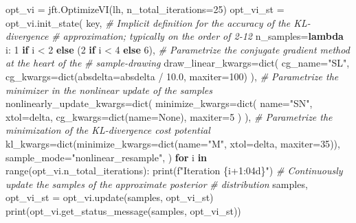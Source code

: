 \documentclass[10pt,a4paper,onecolumn]{article}
\newenvironment{Shaded}{}{}
\newcommand{\BuiltInTok}[1]{#1}
\newcommand{\CommentTok}[1]{\textcolor[rgb]{0.38,0.63,0.69}{\textit{#1}}}
\newcommand{\ControlFlowTok}[1]{\textcolor[rgb]{0.00,0.44,0.13}{\textbf{#1}}}
\newcommand{\DecValTok}[1]{\textcolor[rgb]{0.25,0.63,0.44}{#1}}
\newcommand{\FloatTok}[1]{\textcolor[rgb]{0.25,0.63,0.44}{#1}}
\newcommand{\KeywordTok}[1]{\textcolor[rgb]{0.00,0.44,0.13}{\textbf{#1}}}
\newcommand{\NormalTok}[1]{#1}
\newcommand{\OperatorTok}[1]{\textcolor[rgb]{0.40,0.40,0.40}{#1}}
\newcommand{\SpecialCharTok}[1]{\textcolor[rgb]{0.25,0.44,0.63}{#1}}
\newcommand{\SpecialStringTok}[1]{\textcolor[rgb]{0.73,0.40,0.53}{#1}}
\newcommand{\StringTok}[1]{\textcolor[rgb]{0.25,0.44,0.63}{#1}}
\newcommand{\VariableTok}[1]{\textcolor[rgb]{0.10,0.09,0.49}{#1}}
\begin{document}
\begin{Shaded}
\begin{Highlighting}[]
\NormalTok{opt\_vi }\OperatorTok{=}\NormalTok{ jft.OptimizeVI(lh, n\_total\_iterations}\OperatorTok{=}\DecValTok{25}\NormalTok{)}
\NormalTok{opt\_vi\_st }\OperatorTok{=}\NormalTok{ opt\_vi.init\_state(}
\NormalTok{  key,}
  \CommentTok{\# Implicit definition for the accuracy of the KL{-}divergence}
  \CommentTok{\# approximation; typically on the order of 2{-}12}
\NormalTok{  n\_samples}\OperatorTok{=}\KeywordTok{lambda}\NormalTok{ i: }\DecValTok{1} \ControlFlowTok{if}\NormalTok{ i }\OperatorTok{\textless{}} \DecValTok{2} \ControlFlowTok{else}\NormalTok{ (}\DecValTok{2} \ControlFlowTok{if}\NormalTok{ i }\OperatorTok{\textless{}} \DecValTok{4} \ControlFlowTok{else} \DecValTok{6}\NormalTok{),}
  \CommentTok{\# Parametrize the conjugate gradient method at the heart of the}
  \CommentTok{\# sample{-}drawing}
\NormalTok{  draw\_linear\_kwargs}\OperatorTok{=}\BuiltInTok{dict}\NormalTok{(}
\NormalTok{    cg\_name}\OperatorTok{=}\StringTok{"SL"}\NormalTok{, cg\_kwargs}\OperatorTok{=}\BuiltInTok{dict}\NormalTok{(absdelta}\OperatorTok{=}\NormalTok{absdelta }\OperatorTok{/} \FloatTok{10.0}\NormalTok{, maxiter}\OperatorTok{=}\DecValTok{100}\NormalTok{)}
\NormalTok{  ),}
  \CommentTok{\# Parametrize the minimizer in the nonlinear update of the samples}
\NormalTok{  nonlinearly\_update\_kwargs}\OperatorTok{=}\BuiltInTok{dict}\NormalTok{(}
\NormalTok{    minimize\_kwargs}\OperatorTok{=}\BuiltInTok{dict}\NormalTok{(}
\NormalTok{      name}\OperatorTok{=}\StringTok{"SN"}\NormalTok{, xtol}\OperatorTok{=}\NormalTok{delta, cg\_kwargs}\OperatorTok{=}\BuiltInTok{dict}\NormalTok{(name}\OperatorTok{=}\VariableTok{None}\NormalTok{), maxiter}\OperatorTok{=}\DecValTok{5}
\NormalTok{    )}
\NormalTok{  ),}
  \CommentTok{\# Parametrize the minimization of the KL{-}divergence cost potential}
\NormalTok{  kl\_kwargs}\OperatorTok{=}\BuiltInTok{dict}\NormalTok{(minimize\_kwargs}\OperatorTok{=}\BuiltInTok{dict}\NormalTok{(name}\OperatorTok{=}\StringTok{"M"}\NormalTok{, xtol}\OperatorTok{=}\NormalTok{delta, maxiter}\OperatorTok{=}\DecValTok{35}\NormalTok{)),}
\NormalTok{  sample\_mode}\OperatorTok{=}\StringTok{"nonlinear\_resample"}\NormalTok{,}
\NormalTok{)}
\ControlFlowTok{for}\NormalTok{ i }\KeywordTok{in} \BuiltInTok{range}\NormalTok{(opt\_vi.n\_total\_iterations):}
  \BuiltInTok{print}\NormalTok{(}\SpecialStringTok{f"Iteration }\SpecialCharTok{\{i}\OperatorTok{+}\DecValTok{1}\SpecialCharTok{:04d\}}\SpecialStringTok{"}\NormalTok{)}
  \CommentTok{\# Continuously update the samples of the approximate posterior}
  \CommentTok{\# distribution}
\NormalTok{  samples, opt\_vi\_st }\OperatorTok{=}\NormalTok{ opt\_vi.update(samples, opt\_vi\_st)}
  \BuiltInTok{print}\NormalTok{(opt\_vi.get\_status\_message(samples, opt\_vi\_st))}
\end{Highlighting}
\end{Shaded}
\end{document}
